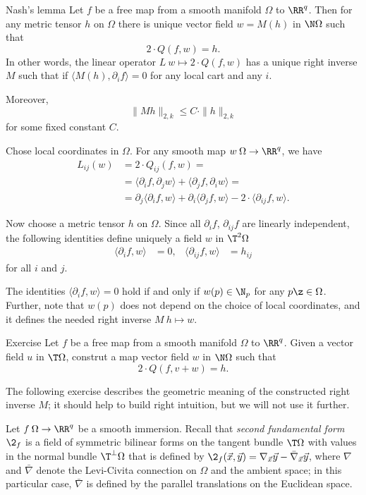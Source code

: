 \begin{thm}{Nash's lemma}\label{lem:nash}
Let $f$ be a free map from a smooth manifold $\Omega$ to $\RR^q$.
Then for any metric tensor $h$ on $\Omega$ there is unique vector field $w=M(h)$ in $\N\Omega$ such that 
\[2\cdot Q(f,w)=h.\]
In other words, the linear operator $L\:w\mapsto 2\cdot Q(f,w)$
has a unique right inverse $M$
such that if $\langle M(h),\partial_if\rangle=0$ for any local cart and any $i$.

Moreover, 
\[\|Mh\|_{2,k}\le C\cdot\|h\|_{2,k}\]
for some fixed constant $C$.
\end{thm}

Chose local coordinates in $\Omega$.
For any smooth map $w\:\Omega\to\RR^q$, we have
\begin{align*}
L_{ij}(w)&=2\cdot Q_{ij}(f,w)=
\\
&=\langle\partial_if,\partial_jw\rangle+\langle\partial_jf,\partial_iw\rangle=
\\
&=\partial_j\langle\partial_if,w\rangle+\partial_i\langle\partial_jf,w\rangle -2\cdot \langle\partial_{ij}f,w\rangle.
\end{align*}

Now choose a metric tensor $h$ on $\Omega$.
Since all $\partial_if$,
$\partial_{ij}f$
are linearly independent,
the following identities define uniquely  a field $w$ in $\T^2\Omega$
\begin{align*}
\langle\partial_{i}f,w\rangle&=0,
&
\langle\partial_{ij}f,w\rangle&=h_{ij}
\end{align*}
for all $i$ and $j$.

The identities $\langle\partial_{i}f,w\rangle=0$ hold if and only if $w(p)\in \N_p$ for any $p\z\in \Omega$.
Further, note that $w(p)$ does not depend on the choice of local coordinates,
and it defines the needed right inverse $M\:h\mapsto w$.
\qeds

\begin{thm}{Exercise}
Let $f$ be a free map from a smooth manifold $\Omega$ to $\RR^q$.
Given a vector field $u$ in $\T\Omega$, construt a map 
vector field $w$ in $\N\Omega$ such that 
\[2\cdot Q(f,v+w)=h.\]
\end{thm}


The following exercise describes the geometric meaning of the constructed right inverse $M$;
it should help to build right intuition, but we will not use it further.

Let $f\:\Omega\to \RR^q$ be a smooth immersion.
Recall that \emph{second fundamental form} $\2_f$ is a field of symmetric bilinear forms on the tangent bundle $\T\Omega $ with values in the normal bundle $\T^\perp\Omega$ that is defined by 
$\2_f(\vec x,\vec y)=\nabla_{\vec x}\vec y-\bar\nabla_{\vec x}\vec y$,
where $\nabla$ and $\bar \nabla$ denote the Levi-Civita connection on $\Omega$ and the ambient space;
in this particular case, $\bar \nabla$ is defined by the parallel translations on the Euclidean space.


